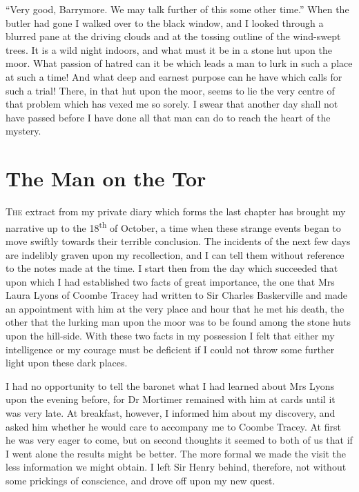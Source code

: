 \documentclass[paper=5.5in:8.5in,BCOR=7mm,twoside,DIV=calc,12pt,usegeometry,openany,chapterprefix,endperiod]{scrbook} %
\begin{document}
\enquote{Very good, Barrymore. We may talk further of this some other time.} When the butler had gone I walked over to the black window, and I looked through a blurred pane at the driving clouds and at the tossing outline of the wind-swept trees. It is a wild night indoors, and what must it be in a stone hut upon the moor. What passion of hatred can it be which leads a man to lurk in such a place at such a time! And what deep and earnest purpose can he have which calls for such a trial! There, in that hut upon the moor, seems to lie the very centre of that problem which has vexed me so sorely. I swear that another day shall not have passed before I have done all that man can do to reach the heart of the mystery.


\chapter{The Man on the Tor}
\lettrine[lines=1]{T}{he} extract from my private diary which forms the last chap\-ter has brought my narrative up to the 18\textsuperscript{th} of October, a time when these strange events began to move swiftly towards their terrible conclusion. The incidents of the next few days are indelibly graven upon my recollection, and I can tell them without reference to the notes made at the time. I start then from the day which succeeded that upon which I had established two facts of great importance, the one that Mrs Laura Lyons of Coombe Tracey had written to Sir Charles Baskerville and made an appointment with him at the very place and hour that he met his death, the other that the lurking man upon the moor was to be found among the stone huts upon the hill-side. With these two facts in my possession I felt that either my intelligence or my courage must be deficient if I could not throw some further light upon these dark places.

I had no opportunity to tell the baronet what I had learned about Mrs Lyons upon the evening before, for Dr Mortimer remained with him at cards until it was very late. At breakfast, however, I informed him about my discovery, and asked him whether he would care to accompany me to Coombe Tracey. At first he was very eager to come, but on second thoughts it seemed to both of us that if I went alone the results might be better. The more formal we made the visit the less information we might obtain. I left Sir Henry behind, therefore, not without some prickings of conscience, and drove off upon my new quest.
\end{document}
